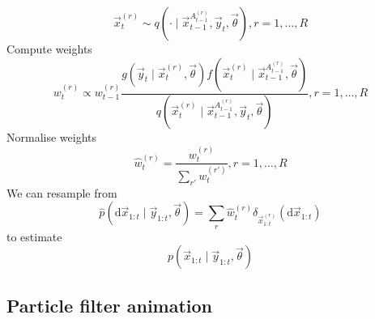\begin{algorithmbis}
\begin{algorithmic}[1]
                    \begin{equation}
                        \vec x_t^{(r)} \sim q\left(\cdot \mid \vec x_{t - 1}^{A_{t - 1}^{(r)}}, \vec y_t, \vec \theta\right), r = 1, \dotsc, R
                    \end{equation}
                \State Compute weights
                    \begin{equation}
                        w_t^{(r)} \propto w_{t - 1}^{(r)} \frac{g\left(\vec y_t \mid \vec x_t^{(r)}, \vec \theta\right) f\left(\vec x_t^{(r)} \mid \vec x_{t - 1}^{A_{t - 1}^{(r)}}, \vec \theta \right)}{q\left(\vec x_t^{(r)} \mid \vec x_{t - 1}^{A_{t - 1}^{(r)}}, \vec y_t, \vec \theta \right)}, r = 1, \dotsc, R
                    \end{equation}
                \State Normalise weights
                    \begin{equation}
                        \hat w_t^{(r)} = \frac{w_t^{(r)}}{\sum_{r'} w_t^{(r')}}, r = 1, \dotsc, R
                    \end{equation}
                \State We can resample from
                    \begin{equation}
                        \hat p(\mathrm d \vec x_{1:t} \mid \vec y_{1:t}, \vec \theta) = \sum_r \hat w_t^{(r)} \delta_{\vec x_{1:t}^{(r)}}(\mathrm d \vec x_{1:t})
                    \end{equation}
                    to estimate
                    \begin{equation}
                        p(\vec x_{1:t} \mid \vec y_{1:t}, \vec \theta)
                    \end{equation}
            \EndFor
        \end{algorithmic}
    \end{algorithmbis}

\subsection{Particle filter animation}

